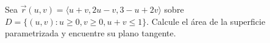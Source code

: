 Sea $\vec r(u,v)=\langle u+v,2u-v,3-u+2v\rangle$ sobre $D=\{(u,v):u\geq0, v\geq0, u+v\leq1\}$. Calcule el área de la superficie parametrizada y encuentre su plano tangente.
